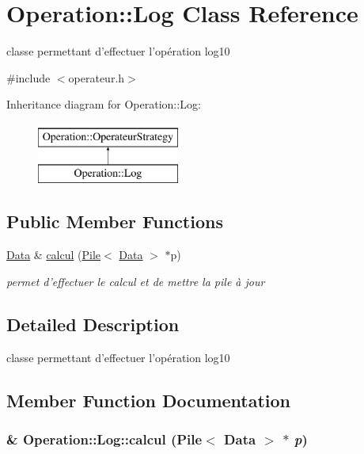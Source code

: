 \hypertarget{classOperation_1_1Log}{
\section{Operation::Log Class Reference}
\label{classOperation_1_1Log}
}


classe permettant d'effectuer l'opération log10  




{\ttfamily \#include $<$operateur.h$>$}

Inheritance diagram for Operation::Log:\begin{figure}[H]
\begin{center}
\leavevmode
\includegraphics[height=2cm]{classOperation_1_1Log}
\end{center}
\end{figure}
\subsection*{Public Member Functions}
\begin{DoxyCompactItemize}
\item 
\hyperlink{classNombre_1_1Data}{Data} \& \hyperlink{classOperation_1_1Log_a9698c868d144a39f521625b9c696c710}{calcul} (\hyperlink{classPile}{Pile}$<$ \hyperlink{classNombre_1_1Data}{Data} $>$ $\ast$p)
\begin{DoxyCompactList}\small\item\em permet d'effectuer le calcul et de mettre la pile à jour \item\end{DoxyCompactList}\end{DoxyCompactItemize}


\subsection{Detailed Description}
classe permettant d'effectuer l'opération log10 

\subsection{Member Function Documentation}
\hypertarget{classOperation_1_1Log_a9698c868d144a39f521625b9c696c710}{
\subsubsection[{calcul}]{\& Operation::Log::calcul ({\bf Pile}$<$ {\bf Data} $>$ $\ast$ {\em p})}}
\label{classOperation_1_1Log_a9698c868d144a39f521625b9c696c710}


